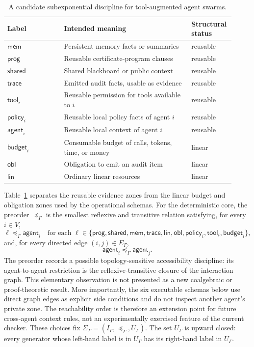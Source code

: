 \documentclass[a4paper,fleqn]{cas-sc}
\begin{document}
\begin{table}[htbp]
\centering
\begin{tabular}{>{\raggedright\arraybackslash}p{0.24\linewidth}>{\raggedright\arraybackslash}p{0.54\linewidth}>{\raggedright\arraybackslash}p{0.14\linewidth}}
\toprule
Label & Intended meaning & Structural status \\
\midrule
\(\mathsf{mem}\) & Persistent memory facts or summaries & reusable \\
\(\mathsf{prog}\) & Reusable certificate-program clauses & reusable \\
\(\mathsf{shared}\) & Shared blackboard or public context & reusable \\
\(\mathsf{trace}\) & Emitted audit facts, usable as evidence & reusable \\
\(\mathsf{tool}_i\) & Reusable permission for tools available to \(i\) & reusable \\
\(\mathsf{policy}_i\) & Reusable local policy facts of agent \(i\) & reusable \\
\(\mathsf{agent}_i\) & Reusable local context of agent \(i\) & reusable \\
\(\mathsf{budget}_i\) & Consumable budget of calls, tokens, time, or money & linear \\
\(\mathsf{obl}\) & Obligation to emit an audit item & linear \\
\(\mathsf{lin}\) & Ordinary linear resources & linear \\
\bottomrule
\end{tabular}
\caption{A candidate subexponential discipline for tool-augmented agent swarms.}
\label{tab:subexponentials}
\end{table}

Table~\ref{tab:subexponentials} separates the reusable evidence zones from the
linear budget and obligation zones used by the operational schemas.
For the deterministic core, the preorder \(\preceq_{\Gamma}\) is the smallest reflexive and transitive relation satisfying, for every \(i\in V\),
\[
  \ell\preceq_{\Gamma}\mathsf{agent}_i
  \quad\text{for each }\ell\in
  \{\mathsf{prog},\mathsf{shared},\mathsf{mem},\mathsf{trace},\mathsf{lin},
  \mathsf{obl},\mathsf{policy}_i,\mathsf{tool}_i,\mathsf{budget}_i\},
\]
and, for every directed edge \((i,j)\in E_{\Gamma}\),
\[
  \mathsf{agent}_i\preceq_{\Gamma}\mathsf{agent}_j.
\]
The preorder records a possible topology-sensitive accessibility discipline:
its agent-to-agent restriction is the reflexive-transitive closure of the
interaction graph. This elementary observation is not presented as a new
coalgebraic or proof-theoretic result. More importantly, the six executable
schemas below use direct graph edges as explicit side conditions and do not
inspect another agent's private zone. The reachability order is therefore an
extension point for future cross-agent context rules, not an experimentally
exercised feature of the current checker.
These choices fix \(\Sigma_{\Gamma}=(I_{\Gamma},\preceq_{\Gamma},U_{\Gamma})\).
The set \(U_{\Gamma}\) is upward closed: every generator whose left-hand
label is in \(U_{\Gamma}\) has its right-hand label in \(U_{\Gamma}\).
\end{document}

